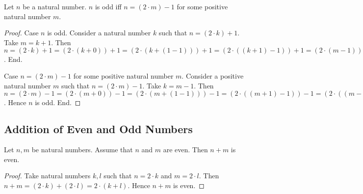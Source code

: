 \documentclass[10pt]{article}
\begin{document}
  \begin{forthel}
    \begin{proposition}
      Let $n$ be a natural number.
      $n$ is odd iff $n = (2 \cdot m) - 1$ for some positive natural number $m$.
    \end{proposition}
    \begin{proof}
      Case $n$ is odd.
        Consider a natural number $k$ such that $n = (2 \cdot k) + 1$.
        Take $m = k + 1$.
        Then $n
          = (2 \cdot k) + 1
          = (2 \cdot (k + 0)) + 1
          = (2 \cdot (k + (1 - 1))) + 1
          = (2 \cdot ((k + 1) - 1)) + 1
          = (2 \cdot (m - 1)) + 1
          = ((2 \cdot m) - (2 \cdot 1)) + 1
          = ((2 \cdot m) - 2) + 1
          = (2 \cdot m) - 1$.
      End.

      Case $n = (2 \cdot m) - 1$ for some positive natural number $m$.
        Consider a positive natural number $m$ such that $n = (2 \cdot m) - 1$.
        Take $k = m - 1$.
        Then $n
          = (2 \cdot m) - 1
          = (2 \cdot (m + 0)) - 1
          = (2 \cdot (m + (1 - 1))) - 1
          = (2 \cdot ((m + 1) - 1)) - 1
          = (2 \cdot ((m - 1) + 1)) - 1
          = (2 \cdot (k + 1)) - 1
          = ((2 \cdot k) + (2 \cdot 1)) - 1
          = ((2 \cdot k) + 2) - 1
          = (2 \cdot k) + (2 - 1)
          = (2 \cdot k) + 1$.
        Hence $n$ is odd.
      End.
    \end{proof}
  \end{forthel}


  \subsection*{Addition of Even and Odd Numbers}

  \begin{forthel}
    \begin{proposition}
      Let $n, m$ be natural numbers.
      Assume that $n$ and $m$ are even.
      Then $n + m$ is even.
    \end{proposition}
    \begin{proof}
      Take natural numbers $k, l$ such that $n = 2 \cdot k$ and $m = 2 \cdot l$.
      Then $n + m
        = (2 \cdot k) + (2 \cdot l)
        = 2 \cdot (k + l)$.
      Hence $n + m$ is even.
    \end{proof}
  \end{forthel}
\end{document}
